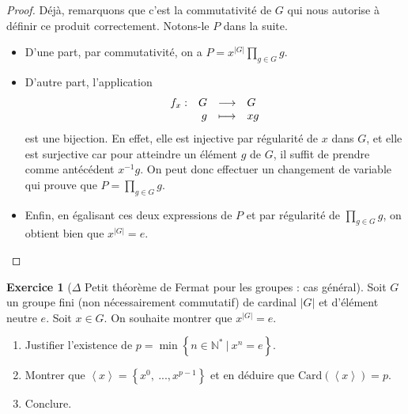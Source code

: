 \documentclass[french]{book}
\newcommand{\N}{\mathbb{N}}
\newcommand{\st}{^*}
\newcommand{\inv}{^{-1}}
\newcommand{\card}{\text{Card}}
\theoremstyle{definition}
\newtheorem{ex}{Exercice}[chapter]
\theoremstyle{theorem}
\theoremstyle{remark}
\begin{document}
\begin{proof}
	Déjà, remarquons que c'est la commutativité de $G$ qui nous autorise à définir ce produit correctement. Notons-le $P$ dans la suite. 
	\begin{itemize}
		\item D'une part, par commutativité, on a $P=x^{|G|}\displaystyle \prod_{g \in G}g$.
		\item D'autre part, l'application 
		$$\begin{array}[t]{lrcl} 
			f_x : & G & \longrightarrow& G \\
			& g & \longmapsto &xg
		\end{array}$$ 
		est une bijection. En effet, elle est injective par régularité de $x$ dans $G$, et elle est surjective car pour atteindre un élément $g$ de $G$, il suffit de prendre comme antécédent $x\inv g$. On peut donc effectuer un changement de variable qui prouve que $P=\displaystyle \prod_{g \in G}g$.
		\item Enfin, en égalisant ces deux expressions de $P$ et par régularité de $\displaystyle \prod_{g \in G}g$, on obtient bien que $x^{|G|}=e$.
	\end{itemize}
\end{proof}

\begin{ex}[$\Delta$ Petit théorème de Fermat pour les groupes : cas général]
	Soit $G$ un groupe fini (non nécessairement commutatif) de cardinal $|G|$ et d'élément neutre $e$. Soit $x \in G$. On souhaite montrer que $x^{|G|}=e$.
	\begin{enumerate}
		\item Justifier l'existence de $p=\min\left\{n \in\N\st \ | \ x^n=e\right\}$.
		\item Montrer que $\left\langle x\right\rangle=\left\{x^0, \ ..., x^{p-1}\right\}$ et en déduire que $\card(\left\langle x\right\rangle)=p$.
		\item Conclure.
	\end{enumerate}
\end{ex}
\end{document}
